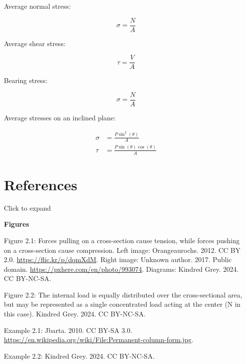 \documentclass[
  letterpaper,
  DIV=11,
  numbers=noendperiod]{scrreprt}
\theoremstyle{definition}
\theoremstyle{remark}
\begin{document}
\begin{tcolorbox}[enhanced jigsaw, leftrule=.75mm, bottomrule=.15mm, opacityback=0, opacitybacktitle=0.6, colframe=quarto-callout-note-color-frame, toprule=.15mm, colbacktitle=quarto-callout-note-color!10!white, coltitle=black, bottomtitle=1mm, title={Key equations}, titlerule=0mm, toptitle=1mm, colback=white, rightrule=.15mm, left=2mm, arc=.35mm, breakable]

Average normal stress:

\[
\sigma=\frac{N}{A}
\]

Average shear stress:

\[
\tau=\frac{V}{A}
\]

Bearing stress:

\[
\sigma=\frac{N}{A}
\]

Average stresses on an inclined plane:

\[
\begin{aligned}
\sigma & =\frac{P \sin ^2(\theta)}{A} \\
\tau & =\frac{P \sin (\theta) \cos (\theta)}{A}
\end{aligned}
\]

\end{tcolorbox}

\section*{References}\label{references-1}


Click to expand

\textbf{Figures}

Figure 2.1: Forces pulling on a cross-section cause tension, while
forces pushing on a cross-section cause compression. Left image:
Orangeaurochs. 2012. CC BY 2.0. \url{https://flic.kr/p/dqmXdM}. Right
image: Unknown author. 2017. Public domain.
\url{https://pxhere.com/en/photo/993074}. Diagrams: Kindred Grey. 2024.
CC BY-NC-SA.

Figure 2.2: The internal load is equally distributed over the
cross-sectional area, but may be represented as a single concentrated
load acting at the center (N in this case). Kindred Grey. 2024. CC
BY-NC-SA.

Example 2.1: Jbarta. 2010. CC BY-SA 3.0.
\url{https://en.wikipedia.org/wiki/File:Permanent-column-form.jpg}.

Example 2.2: Kindred Grey. 2024. CC BY-NC-SA.
\end{document}
